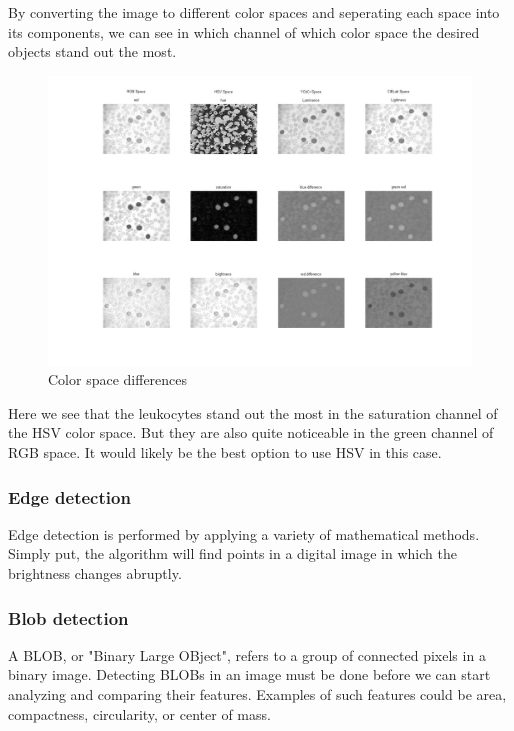 			By converting the image to different color spaces and seperating each space into its components, we can see in which channel of which color space the desired objects stand out the most. 
			
					\begin{figure}[H]
				\centering
				\includegraphics[width=\linewidth]{figure/Analysis/differences.jpg}
				\caption{Color space differences}
				\label{fig:differences}
			\end{figure}
		Here we see that the leukocytes stand out the most in the saturation channel of the HSV color space. But they are also quite noticeable in the green channel of RGB space. It would likely be the best option to use HSV in this case. 
		
			\subsubsection{Edge detection}
			
			Edge detection is performed by applying a variety of mathematical methods. Simply put, the algorithm will find points in a digital image in which the brightness changes abruptly. 
			
			\subsubsection{Blob detection}
			
			A BLOB, or "Binary Large OBject", refers to a group of connected pixels in a binary image. Detecting BLOBs in an image must be done before we can start analyzing and comparing their features. Examples of such features could be area, compactness, circularity, or center of mass.
			
